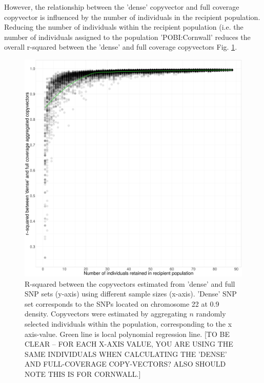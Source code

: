 However, the relationship between the 'dense' copyvector and full coverage copyvector is influenced by the number of individuals in the recipient population. Reducing the number of individuals within the recipient population (i.e. the number of individuals assigned to the population 'POBI:Cornwall' reduces the overall r-squared between the 'dense' and full coverage copyvectors Fig. \ref{fig:Ssparse_cornwall_collapsed_random_remove_inds}.

\begin{figure}[htp]
    \centering
    \includegraphics[width=1.0\textwidth]{../images/chapter1/Ssparse_cornwall_collapsed_random_remove_inds.pdf}
    \caption{R-squared between the copyvectors estimated from 'dense' and full SNP sets (y-axis) using different sample sizes (x-axis). 'Dense' SNP set corresponds to the SNPs located on chromosome 22 at 0.9 density. Copyvectors were estimated by aggregating $n$ randomly selected individuals within the population, corresponding to the x axis-value. Green line is local polynomial regression line. {\color{red}[TO BE CLEAR -- FOR EACH X-AXIS VALUE, YOU ARE USING THE SAME INDIVIDUALS WHEN CALCULATING THE 'DENSE' AND FULL-COVERAGE COPY-VECTORS? ALSO SHOULD NOTE THIS IS FOR CORNWALL.]}}
    \label{fig:Ssparse_cornwall_collapsed_random_remove_inds}
\end{figure}

